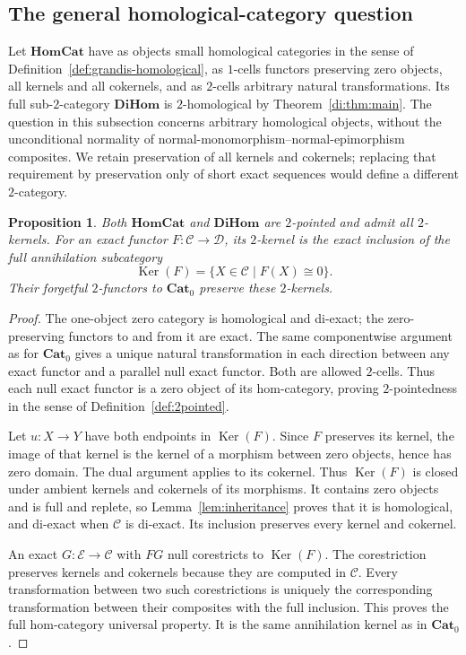 \documentclass[11pt,reqno,a4paper]{amsart}
\newtheorem{proposition}[theorem]{Proposition}
\theoremstyle{definition}
\theoremstyle{remark}
\newcommand{\C}{\mathcal{C}}
\newcommand{\D}{\mathcal{D}}
\newcommand{\E}{\mathcal{E}}
\newcommand{\0}{\mathbf{0}}
\renewcommand{\1}{\mathbf{1}}
\newcommand{\Pt}{\mathbf{Cat}_{0}}
\newcommand{\HomCat}{\mathbf{HomCat}}
\newcommand{\DiHom}{\mathbf{DiHom}}
\DeclareMathOperator{\Ker}{Ker}
\begin{document}
\subsection{The general homological-category question}\label{sec:homcat}

Let $\HomCat$ have as objects small homological categories in the
sense of Definition~\ref{def:grandis-homological}, as $1$-cells
functors preserving zero objects, all
kernels and all cokernels, and as $2$-cells arbitrary natural
transformations. Its full sub-$2$-category $\DiHom$ is
$2$-homological by Theorem~\ref{di:thm:main}. The question in this
subsection concerns arbitrary homological objects, without the
unconditional normality of normal-monomorphism--normal-epimorphism
composites. We retain preservation of all kernels and cokernels;
replacing that requirement by preservation only of short exact
sequences would define a different $2$-category.

\begin{proposition}\label{prop:homcat-kernels}
Both $\HomCat$ and $\DiHom$ are $2$-pointed and admit all
$2$-kernels. For an exact functor $F:\C\to\D$, its $2$-kernel is
the exact inclusion of the full annihilation subcategory
\[
 \Ker(F)=\{X\in\C\mid F(X)\cong0\}.
\]
Their forgetful $2$-functors to $\Pt$ preserve these $2$-kernels.
\end{proposition}
\begin{proof}
The one-object zero category is homological and di-exact; the
zero-preserving functors to and from it are exact. The same
componentwise argument as for $\Pt$ gives a unique natural
transformation in each direction between any exact functor and a
parallel null exact functor. Both are allowed $2$-cells. Thus each
null exact functor is a zero object of its hom-category, proving
$2$-pointedness in the sense of Definition~\ref{def:2pointed}.

Let $u:X\to Y$ have both endpoints in $\Ker(F)$. Since $F$
preserves its kernel, the image of that kernel is the kernel of
a morphism between zero objects, hence has zero domain. The dual
argument applies to its cokernel. Thus $\Ker(F)$ is closed under
ambient kernels and cokernels of its morphisms. It contains zero
objects and is full and replete, so Lemma~\ref{lem:inheritance}
proves that it is homological, and di-exact when $\C$ is di-exact.
Its inclusion preserves every kernel and cokernel.

An exact $G:\E\to\C$ with $FG$ null corestricts to $\Ker(F)$.
The corestriction preserves kernels and cokernels because they are
computed in $\C$. Every transformation between two such
corestrictions is uniquely the corresponding transformation between
their composites with the full inclusion. This proves the full
hom-category universal property.
It is the same annihilation kernel as in $\Pt$.
\end{proof}
\end{document}
